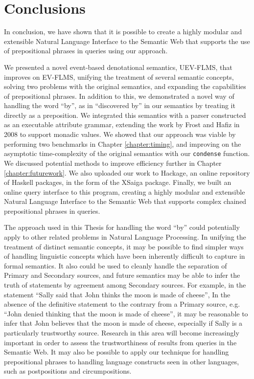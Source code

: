 \documentclass[../main.tex]{subfiles}
\begin{document}
\chapter{Conclusions}

In conclusion, we have shown that it is possible to create a highly modular and extensible Natural Language Interface to the Semantic Web that supports the use of prepositional phrases in queries using our approach.

We presented a novel event-based denotational semantics, UEV-FLMS, that improves on EV-FLMS, unifying
the treatment of several semantic concepts, solving two problems with the original semantics, and expanding the capabilities of prepositional phrases.
In addition to this, we demonstrated a novel way of handling the word ``by'', as in ``discovered by'' in our semantics by treating it directly as a preposition.
We integrated this semantics with a parser constructed as an executable attribute grammar, extending the work by Frost and Hafiz in 2008\cite{frosthafiz2008} to support
monadic values.  We showed that our approach was viable by performing two benchmarks in Chapter \ref{chapter:timing}, and improving on the asymptotic time-complexity of the original semantics with our \texttt{condense} function.  We discussed potential methods to improve efficiency further in Chapter \ref{chapter:futurework}.  We also uploaded our work to Hackage, an online repository of Haskell packages, in the form of the XSaiga package.  Finally, we built an online query interface to this program, creating a highly modular and extensible Natural Language Interface to the Semantic Web that supports complex chained prepositional phrases in queries.

The approach used in this Thesis for handling the word ``by'' could potentially apply to other related problems in Natural Language Processing.
In unifying the treatment of distinct semantic concepts, it may be possible to find simpler ways of handling linguistic concepts which have been inherently difficult
to capture in formal semantics.  It also could be used to cleanly handle the separation of Primary and Secondary sources, and future semantics may be able to infer
the truth of statements by agreement among Secondary sources.  For example, in the statement ``Sally said that John thinks the moon is made of cheese'',
In the absence of the definitive statement to the contrary from a Primary source, e.g. ``John denied thinking that the moon is made of cheese'', it may be reasonable
to infer that John believes that the moon is made of cheese, especially if Sally is a particularly trustworthy source.  Research in this area will
become increasingly important in order to assess the trustworthiness of results from queries in the Semantic Web.  It may also be possible to apply our technique
for handling prepositional phrases to handling language constructs seen in other languages, such as postpositions and circumpositions.
\end{document}
